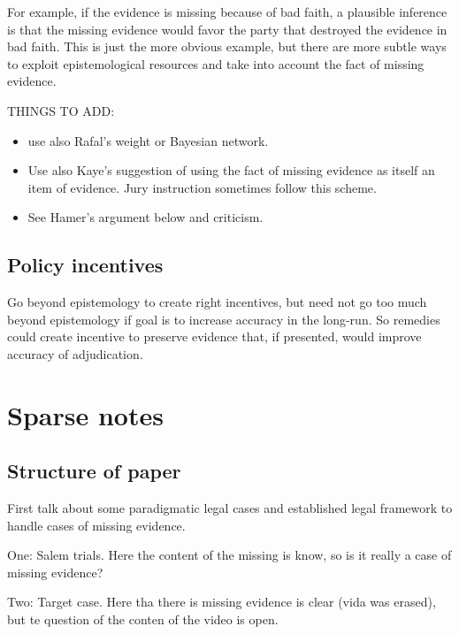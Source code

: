 \documentclass[
  10pt,
  dvipsnames,enabledeprecatedfontcommands]{scrartcl}
\begin{document}
For example, if the evidence is missing because of bad faith, a
plausible inference is that the missing evidence would favor the party
that destroyed the evidence in bad faith. This is just the more obvious
example, but there are more subtle ways to exploit epistemological
resources and take into account the fact of missing evidence.

THINGS TO ADD:

\begin{itemize}
\item
  use also Rafal's weight or Bayesian network.
\item
  Use also Kaye's suggestion of using the fact of missing evidence as
  itself an item of evidence. Jury instruction sometimes follow this
  scheme.
\item
  See Hamer's argument below and criticism.
\end{itemize}

\hypertarget{policy-incentives}{%
\subsection{Policy incentives}\label{policy-incentives}}

Go beyond epistemology to create right incentives, but need not go too
much beyond epistemology if goal is to increase accuracy in the
long-run. So remedies could create incentive to preserve evidence that,
if presented, would improve accuracy of adjudication.

\hypertarget{sparse-notes}{%
\section{Sparse notes}\label{sparse-notes}}

\hypertarget{structure-of-paper}{%
\subsection{Structure of paper}\label{structure-of-paper}}

First talk about some paradigmatic legal cases and established legal
framework to handle cases of missing evidence.

One: Salem trials. Here the content of the missing is know, so is it
really a case of missing evidence?

Two: Target case. Here tha there is missing evidence is clear (vida was
erased), but te question of the conten of the video is open.
\end{document}
